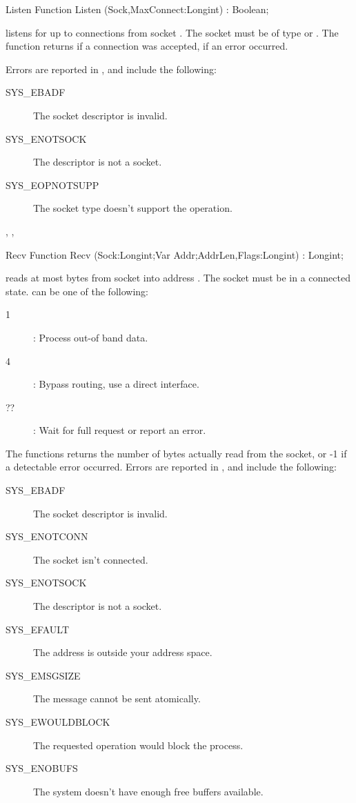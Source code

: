 \begin{function}{Listen}
\Declaration
Function Listen (Sock,MaxConnect:Longint) : Boolean;

\Description
{} listens for up to  connections from socket
. The socket  must be of type  or
.
The function returns  if a connection was accepted,  
if an error occurred.

\Errors
Errors are reported in , and include the following:
\begin{description}
\item[SYS\_EBADF] The socket descriptor is invalid.
\item[SYS\_ENOTSOCK] The descriptor is not a socket.
\item[SYS\_EOPNOTSUPP] The socket type doesn't support the 
operation.
\end{description}

\SeeAlso
{}, , 
\end{function}
\begin{function}{Recv}
\Declaration
Function Recv (Sock:Longint;Var Addr;AddrLen,Flags:Longint) : Longint;

\Description
{} reads at most  bytes from socket  into
address . The socket must be in a connected state.
 can be one of the following:
\begin{description}
\item [1] : Process out-of band data.
\item [4] : Bypass routing, use a direct interface.
\item [??] : Wait for full request or report an error.
\end{description}
The functions returns the number of bytes actually read from the socket, or
-1 if a detectable error occurred.
\Errors
Errors are reported in , and include the following:
\begin{description}
\item[SYS\_EBADF] The socket descriptor is invalid.
\item[SYS\_ENOTCONN] The socket isn't connected.
\item[SYS\_ENOTSOCK] The descriptor is not a socket.
\item[SYS\_EFAULT] The address is outside your address space.
\item[SYS\_EMSGSIZE] The message cannot be sent atomically.
\item[SYS\_EWOULDBLOCK] The requested operation would block the process.
\item[SYS\_ENOBUFS] The system doesn't have enough free buffers available.
\end{description}

\SeeAlso
{}
\end{function}
